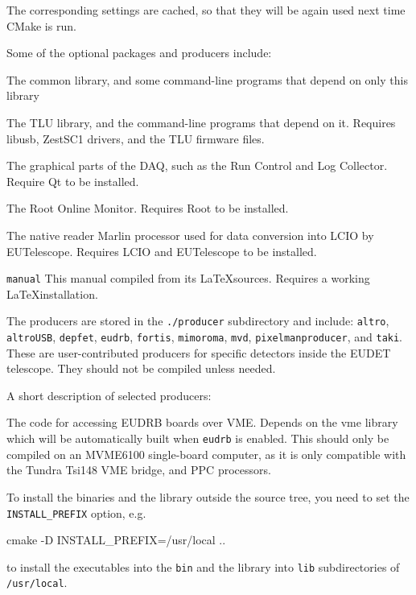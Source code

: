 The corresponding settings are cached, so that they will be again used
next time CMake is run.

Some of the optional packages and producers include:
\begin{description}

The common library, and some command-line programs that depend on only this library

The \gls{TLU} library, and the command-line programs that depend on
it. Requires libusb, ZestSC1 drivers, and the TLU firmware files.

The graphical parts of the DAQ, such as the Run Control and Log
Collector. Require Qt to be installed.

The Root Online Monitor. Requires Root to be installed.

The native reader Marlin processor used for data conversion into LCIO
by EUTelescope. Requires LCIO and EUTelescope to be installed.

\texttt{manual}
This manual compiled from its \LaTeX sources. Requires a working
\LaTeX installation.

\end{description}

The producers are stored in the \texttt{./producer} subdirectory and
include: \texttt{altro}, \texttt{altroUSB}, \texttt{depfet},
\texttt{eudrb}, \texttt{fortis}, \texttt{mimoroma}, \texttt{mvd},
\texttt{pixelmanproducer}, and \texttt{taki}. These are
user-contributed producers for specific detectors inside the EUDET
telescope.  They should not be compiled unless needed.

A short description of selected producers:
\begin{description}

The code for accessing EUDRB boards over VME.  Depends
on the vme library which will be automatically built
when \texttt{eudrb} is enabled. This should only be compiled on an
MVME6100 single-board computer, as it is only compatible with the
Tundra Tsi148 VME bridge, and PPC processors.
\end{description}



To install the binaries and the library outside the source tree, you
need to set the \texttt{INSTALL\_PREFIX} option, e.g.
\begin{listing}[mybash]
cmake -D INSTALL_PREFIX=/usr/local ..
\end{listing}
to install the executables into the \texttt{bin} and the library into \texttt{lib} subdirectories of \texttt{/usr/local}.

